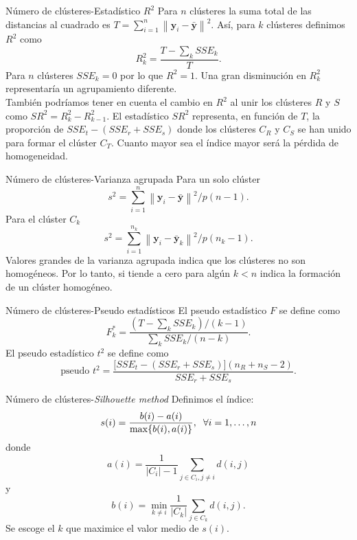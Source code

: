 \documentclass[spanish]{beamer}
\newcommand{\norm}[1]{\left\lVert#1\right\rVert}
\newcommand{\yy}{\textbf{y}}
\begin{document}
\begin{frame}{Número de clústeres-Estadístico $ R^2 $}
	Para $ n $ clústeres la suma total de las distancias al cuadrado es $ T = \sum_{i = 1}^{n} \norm{\yy_i - \bar{\yy}}^2 $. Así, para $ k $ clústeres definimos $ R^2 $ como
	\[
	R^{2}_{k} = \frac{T - \sum_k SSE_k}{T}.
	\]
	Para $ n $ clústeres $ SSE_k = 0 $ por lo que $ R^2 = 1 $. Una gran disminución en $ R^2_k $ representaría un agrupamiento diferente. \\
	También podríamos tener en cuenta el cambio en $ R^2 $ al unir los clústeres $ R $ y $ S $ como $ SR^2 = R_k^2 - R^2_{k-1} $. El estadístico $ SR^2 $ representa, en función de $ T $, la proporción de $ SSE_t - (SSE_r + SSE_s) $ donde los clústeres $ C_R $ y $ C_S $ se han unido para formar el clúster $ C_T $.  Cuanto mayor sea el índice mayor será la pérdida de homogeneidad.
\end{frame}

\begin{frame}{Número de clústeres-Varianza agrupada}
	Para un solo clúster \[ s^2 = \sum_{i=1}^{n} \norm{\yy_i - \bar{\yy}}^2/ p(n-1).\]
	Para el clúster $ C_k $
	\[
	s^2 = \sum_{i=1}^{n_k} \norm{\yy_i - \bar{\yy}_k}^2/ p(n_k-1).
	\]
	Valores grandes de la varianza agrupada indica que los clústeres no son homogéneos. Por lo tanto, si tiende a cero para algún $  k < n $ indica la formación de un clúster homogéneo.
\end{frame}

\begin{frame}{Número de clústeres-Pseudo estadísticos}
	El pseudo estadístico $ F $ se define como
	\[
	F^*_k = \frac{(T-\sum_k SSE_k) / (k-1)}{\sum_k SSE_k / (n-k)}.
	\]
	El pseudo estadístico $ t^2 $ se define como
	\[
	\text{pseudo }t^2 = \frac{\lbrack SSE_t - (SSE_r + SSE_s)\rbrack(n_R + n_S - 2)}{SSE_r + SSE_s}.
	\]
\end{frame}

\begin{frame}{Número de clústeres-\textit{Silhouette method}}
	Definimos el índice:
	\[
	s(i) = \frac{b(i)-a(i)}{\max\{b(i), a(i)\}}, \hspace{2mm} \forall i = 1, \dots, n
	\] 
	donde 
	\[
	a(i) = \frac{1}{|C_i|-1}\sum_{j\in C_i, j \neq i} d(i,j) 
	\]	y
	\[
	b(i) = \min_{k \neq i} \frac{1}{|C_k|} \sum_{j \in C_k} d(i,j).
	\] 
	Se escoge el $ k $ que maximice el valor medio de $ s(i) $.
\end{frame}
\end{document}

